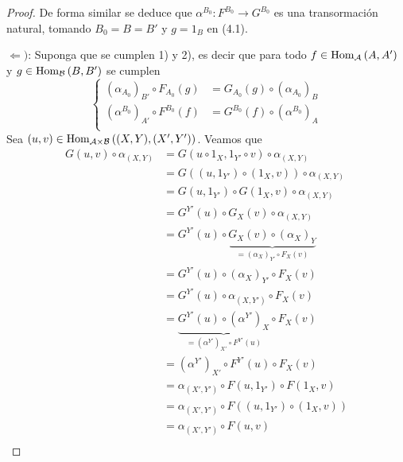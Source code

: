 \documentclass[12pt]{report}
\newcounter{it}
\theoremstyle{largebreak}
\newcommand\cf[3]{\ensuremath{#1:#2\rightarrow#3}}
\newcommand{\Hom}[3]{\ensuremath{\textup{Hom}_{#1}\left(#2,#3\right)}}
\begin{document}
\begin{proof}
        De forma similar se deduce que $\cf{\alpha^{B_0}}{F^{B_0}}{G^{B_0}}$ es una transormación natural, tomando $B_0=B=B'$ y $g=1_B$ en (4.1).
        
        $\Leftarrow)$: Suponga que se cumplen 1) y 2), es decir que para todo $f\in\Hom{\mathcal{A}}{A}{A'}$ y $g\in\Hom{\mathcal{B}}{B}{B'}$ se cumplen
        \begin{equation*}
            \left\{
                \begin{split}
                    (\alpha_{A_0})_{B'}\circ F_{A_0}(g)&=G_{A_0}(g)\circ (\alpha_{A_0})_B\\
                    (\alpha^{B_0})_{A'}\circ F^{B_0}(f)&=G^{B_0}(f)\circ (\alpha^{B_0})_A\\
                \end{split}
            \right.
        \end{equation*}
        Sea $(u,v)\in\Hom{\mathcal{A}\times\mathcal{B}}{(X,Y)}{(X',Y')}$. Veamos que
        \begin{equation*}
            \begin{split}
                G(u,v)\circ\alpha_{(X,Y)}&=G(u\circ 1_X,1_{Y'}\circ v)\circ\alpha_{(X,Y)}\\
                &=G((u,1_{Y'})\circ(1_X,v))\circ\alpha_{(X,Y)}\\
                &=G(u,1_{Y'})\circ G(1_X,v)\circ\alpha_{(X,Y)}\\
                &=G^{Y'}(u)\circ G_X(v)\circ\alpha_{(X,Y)}\\
                &=G^{Y'}(u)\circ \underbrace{G_X(v)\circ(\alpha_X)_Y}_{=(\alpha_X)_{Y'}\circ F_X(v)} \\
                &=G^{Y'}(u)\circ (\alpha_X)_{Y'}\circ F_X(v)\\
                &=G^{Y'}(u)\circ\alpha_{(X,Y')}\circ F_X(v)\\
                &=\underbrace{G^{Y'}(u)\circ(\alpha^{ Y'})_X}_{= (\alpha^{Y'})_{X'}\circ F^{Y'}(u)} \circ F_X(v)\\
                &=(\alpha^{Y'})_{X'}\circ F^{Y'}(u)\circ F_X(v)\\
                &=\alpha_{(X',Y')} \circ F(u,1_{Y'})\circ F(1_X,v)\\
                &=\alpha_{(X',Y')} \circ F((u,1_{Y'})\circ(1_X,v))\\
                &=\alpha_{(X',Y')} \circ F(u,v)\\
            \end{split}
        \end{equation*}

\end{proof}
\end{document}
